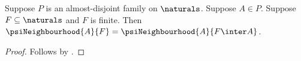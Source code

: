 \begin{proposition}\label{psi_neighbourhood_finite_set_normalization_regression}
    Suppose $P$ is an almost-disjoint family on $\naturals$.
    Suppose $A\in P$.
    Suppose $F\subseteq\naturals$ and $F$ is finite.
    Then $\psiNeighbourhood{A}{F}
        =\psiNeighbourhood{A}{F\inter A}$.
\end{proposition}
\begin{proof}
    Follows by .
\end{proof}
